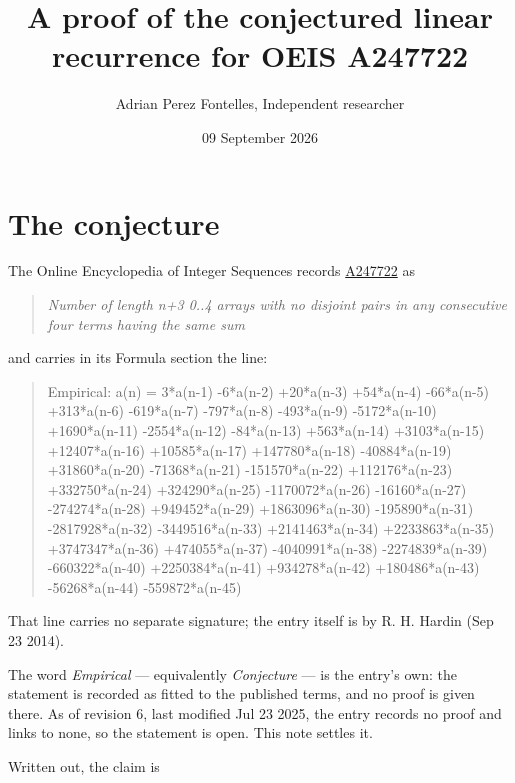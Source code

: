 \documentclass[11pt]{article}
\title{A proof of the conjectured linear recurrence for OEIS A247722}
\author{Adrian Perez Fontelles, Independent researcher}
\date{09 September 2026}
\theoremstyle{definition}
\begin{document}
\maketitle
\section{The conjecture}

The Online Encyclopedia of Integer Sequences records \href{https://oeis.org/A247722}{A247722} as

\begin{quote}\itshape Number of length n+3 0..4 arrays with no disjoint pairs in any consecutive four terms having the same sum\end{quote}

and carries in its Formula section the line:

\begin{quote}\ttfamily Empirical: a(n) = 3*a(n-1) -6*a(n-2) +20*a(n-3) +54*a(n-4) -66*a(n-5) +313*a(n-6) -619*a(n-7) -797*a(n-8) -493*a(n-9) -5172*a(n-10) +1690*a(n-11) -2554*a(n-12) -84*a(n-13) +563*a(n-14) +3103*a(n-15) +12407*a(n-16) +10585*a(n-17) +147780*a(n-18) -40884*a(n-19) +31860*a(n-20) -71368*a(n-21) -151570*a(n-22) +112176*a(n-23) +332750*a(n-24) +324290*a(n-25) -1170072*a(n-26) -16160*a(n-27) -274274*a(n-28) +949452*a(n-29) +1863096*a(n-30) -195890*a(n-31) -2817928*a(n-32) -3449516*a(n-33) +2141463*a(n-34) +2233863*a(n-35) +3747347*a(n-36) +474055*a(n-37) -4040991*a(n-38) -2274839*a(n-39) -660322*a(n-40) +2250384*a(n-41) +934278*a(n-42) +180486*a(n-43) -56268*a(n-44) -559872*a(n-45)\end{quote}

That line carries no separate signature; the entry itself is by R. H. Hardin (Sep 23 2014).

The word {\itshape Empirical} --- equivalently {\itshape Conjecture} --- is the entry's own: the statement is recorded as fitted to the published terms, and no proof is given there. As of revision 6, last modified Jul 23 2025, the entry records no proof and links to none, so the statement is open. This note settles it.

Written out, the claim is
\end{document}
